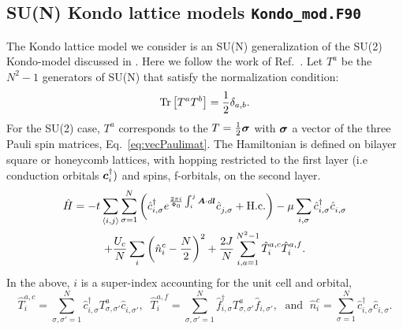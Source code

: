 

\subsection{SU(N) Kondo lattice models \texttt{Kondo\_mod.F90}}  \label{sec:kondo}

The Kondo lattice model we consider is an SU(N) generalization of the SU(2) Kondo-model discussed in \cite{Capponi00,Assaad99a}.
Here we follow the work of  Ref.~\cite{Raczkowski20}.
Let $T^{a}$ be the $N^2 -1  $ generators of SU(N) that satisfy the normalization condition: 
\begin{equation}
	\mathop{\mathrm{Tr}}  \left[ T^{a} T^{b} \right]   = \frac{1}{2}\delta_{a,b}.
\label{Normalization_condition.eq}
\end{equation}
For the SU(2) case, $T^{a}$  corresponds to the $T  = \frac{1}{2} \boldsymbol{\sigma}$ with $\boldsymbol{\sigma}$   a vector of the three Pauli spin matrices, Eq.~\eqref{eq:vecPaulimat}.      The   Hamiltonian is defined on bilayer  square or honeycomb lattices, with  hopping restricted to the  first layer  (i.e  conduction orbitals $\boldsymbol{c}^{\dagger}_{i}  )$   and  spins, f-orbitals, on the second layer. 
\begin{multline}
	\hat{H} = - t  \sum_{\langle i,j \rangle}    \sum_{\sigma=1}^{N}  \left(  \hat{c}^{\dagger}_{i,\sigma}  e^{\frac{2\pi i}{\Phi_0}  \int_{i}^{j} \ve{A}\cdot d \ve{l}}\hat{c}^{\phantom\dagger}_{j,\sigma}   + \hc  \right)  - \mu \sum_{i,\sigma} \hat{c}^{\dagger}_{i,\sigma}  \hat{c}^{\phantom\dagger}_{i,\sigma}  \\ 
   + \frac{U_c}{N}  \sum_{i}   \left( \hat{n}^c_i -  \frac{N}{2} \right)^2  
         +  \frac{2 J}{N} \sum_{i, a=1  }^{N^2 -1}  \hat{T}^{a,c}_{i}  \hat{T}^{a,f}_{i}. 
\label{Kondo_SUN_Ham.eq}
\end{multline}
In the above, $i$ is a super-index accounting for the unit cell and orbital,
\begin{equation}
	 \hat{T}^{a,c}_{i}   =   \sum_{\sigma,\sigma'=1}^{N} \hat{c}^{\dagger}_{i,\sigma}T^{a}_{\sigma,\sigma'}  \hat{c}^{\phantom\dagger}_{i,\sigma'}, \; \; 
	  \hat{T}^{a,f}_{i}   = \sum_{\sigma,\sigma'=1}^{N} \hat{f}^{\dagger}_{i,\sigma} T^{a}_{\sigma,\sigma'}  \hat{f}^{\phantom\dagger}_{i,\sigma'},  
	  \;\text{ and }\;   \hat{n}^c_i  = \sum_{\sigma=1}^{N} \hat{c}_{i,\sigma}^{\dagger} \hat{c}_{i,\sigma}^{\phantom\dagger} .
\end{equation}
